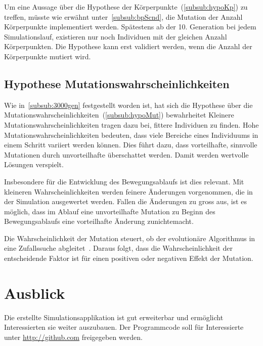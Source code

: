       Um eine Aussage über die Hypothese der Körperpunkte~(\vref{subsub:hypoKp}) zu treffen,
      müsste wie erwähnt unter~\vref{subsub:bpScnd}, die Mutation der Anzahl Körperpunkte implementiert werden.
      Spätestens ab der 10. Generation bei jedem Simulationslauf,
      existieren nur noch Individuen mit der gleichen Anzahl Körperpunkten.
      Die Hypothese kann erst validiert werden, wenn die Anzahl der Körperpunkte mutiert wird.

    \subsection{Hypothese Mutationswahrscheinlichkeiten}

      Wie in~\vref{subsub:3000gen} festgestellt worden ist,
      hat sich die Hypothese über die Mutationswahrscheinlichkeiten~(\vref{subsub:hypoMut}) bewahrheitet
      Kleinere Mutationswahrscheinlichkeiten tragen dazu bei, fittere Individuen zu finden.
      Hohe Mutationswahrscheinlichkeiten bedeuten,
      dass viele Bereiche eines Individuums in einem Schritt variiert werden können.
      Dies führt dazu, dass vorteilhafte, sinnvolle Mutationen durch unvorteilhafte überschattet werden.
      Damit werden wertvolle Lösungen verspielt.

      \medskip

      Insbesondere für die Entwicklung des Bewegungsablaufs ist dies relevant.
      Mit kleineren Wahrscheinlichkeiten werden feinere Änderungen vorgenommen,
      die in der Simulation ausgewertet werden.
      Fallen die Änderungen zu gross aus, ist es möglich, dass im Ablauf eine unvorteilhafte Mutation
      zu Beginn des Bewegungsablaufs eine vorteilhafte Änderung zunichtemacht.

      \medskip

      Die Wahrscheinlichkeit der Mutation steuert,
      ob der evolutionäre Algorithmus in eine Zufallssuche abgleitet~\cite{Sampson1976}.
      Daraus folgt, dass die Wahrscheinlichkeit der entscheidende Faktor ist für einen positiven oder
      negativen Effekt der Mutation.

  \section{Ausblick\label{sec:ausblick}}

    Die erstellte Simulationsapplikation ist gut erweiterbar und ermöglicht Interessierten sie weiter auszubauen.
    Der Programmcode soll für Interessierte unter \url{http://github.com} freigegeben werden.

